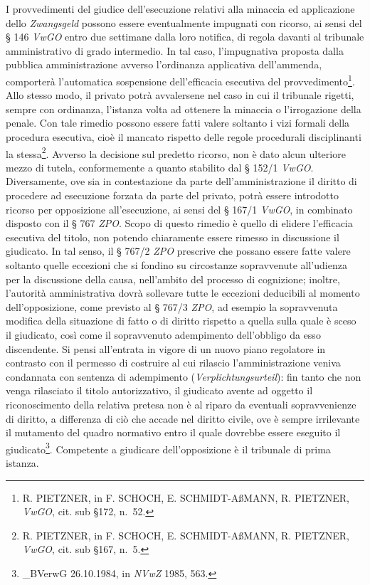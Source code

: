\documentclass[12pt,it,a4paper,]{report}
\begin{document}
I provvedimenti del giudice dell'esecuzione relativi alla minaccia ed
applicazione dello \emph{Zwangsgeld} possono essere eventualmente
impugnati con ricorso, ai sensi del § 146 \emph{VwGO} entro due
settimane dalla loro notifica, di regola davanti al tribunale
amministrativo di grado intermedio. In tal caso, l'impugnativa proposta
dalla pubblica amministrazione avverso l'ordinanza applicativa
dell'ammenda, comporterà l'automatica sospensione dell'efficacia
esecutiva del provvedimento\footnote{R. PIETZNER, in F. SCHOCH, E.
  SCHMIDT-AßMANN, R. PIETZNER, \emph{VwGO}, cit. sub §172, n.~52.}. Allo
stesso modo, il privato potrà avvalersene nel caso in cui il tribunale
rigetti, sempre con ordinanza, l'istanza volta ad ottenere la minaccia o
l'irrogazione della penale. Con tale rimedio possono essere fatti valere
soltanto i vizi formali della procedura esecutiva, cioè il mancato
rispetto delle regole procedurali disciplinanti la stessa\footnote{R.
  PIETZNER, in F. SCHOCH, E. SCHMIDT-AßMANN, R. PIETZNER, \emph{VwGO},
  cit. sub §167, n.~5.}. Avverso la decisione sul predetto ricorso, non
è dato alcun ulteriore mezzo di tutela, conformemente a quanto stabilito
dal § 152/1 \emph{VwGO}. Diversamente, ove sia in contestazione da parte
dell'amministrazione il diritto di procedere ad esecuzione forzata da
parte del privato, potrà essere introdotto ricorso per opposizione
all'esecuzione, ai sensi del § 167/1 \emph{VwGO}, in combinato disposto
con il § 767 \emph{ZPO}. Scopo di questo rimedio è quello di elidere
l'efficacia esecutiva del titolo, non potendo chiaramente essere rimesso
in discussione il giudicato. In tal senso, il § 767/2 \emph{ZPO}
prescrive che possano essere fatte valere soltanto quelle eccezioni che
si fondino su circostanze sopravvenute all'udienza per la discussione
della causa, nell'ambito del processo di cognizione; inoltre, l'autorità
amministrativa dovrà sollevare tutte le eccezioni deducibili al momento
dell'opposizione, come previsto al § 767/3 \emph{ZPO}, ad esempio la
sopravvenuta modifica della situazione di fatto o di diritto rispetto a
quella sulla quale è sceso il giudicato, così come il sopravvenuto
adempimento dell'obbligo da esso discendente. Si pensi all'entrata in
vigore di un nuovo piano regolatore in contrasto con il permesso di
costruire al cui rilascio l'amministrazione veniva condannata con
sentenza di adempimento (\emph{Verplichtungsurteil}): fin tanto che non
venga rilasciato il titolo autorizzativo, il giudicato avente ad oggetto
il riconoscimento della relativa pretesa non è al riparo da eventuali
sopravvenienze di diritto, a differenza di ciò che accade nel diritto
civile, ove è sempre irrilevante il mutamento del quadro normativo entro
il quale dovrebbe essere eseguito il giudicato\footnote{\_BVerwG
  26.10.1984, in \emph{NVwZ} 1985, 563.}. Competente a giudicare
dell'opposizione è il tribunale di prima istanza.
\end{document}
